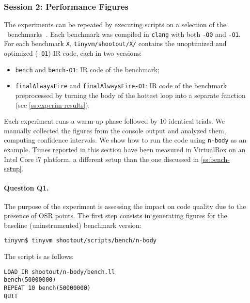 
\subsubsection{Session 2: Performance Figures}

The experiments can be repeated by executing scripts on a selection of the \shootout\ benchmarks~\cite{shootout}. Each benchmark was compiled in {\tt clang} with both {\tt -O0} and {\tt -O1}. For each benchmark {\tt X}, {\tt tinyvm/shootout/X/} contains the unoptimized and optimized ({\tt -O1}) IR code, each in two versions:

\begin{itemize}[parsep=0pt]
\item {\tt bench} and {\tt bench-O1}: IR code of the benchmark;
\item {\tt finalAlwaysFire} and {\tt finalAlwaysFire-O1}: IR code of the benchmark preprocessed by turning the body of the hottest loop into a separate function (see \ref{ss:experim-results}).
\end{itemize}

\noindent Each experiment runs a warm-up phase followed by 10 identical trials. We manually collected the figures from the console output and analyzed them, computing confidence intervals. We show how to run the code using {\tt n-body} as an example. Times reported in this section have been measured in VirtualBox on an Intel Core i7 platform, a different setup than the one discussed in \ref{ss:bench-setup}.

\paragraph{Question Q1.} The purpose of the experiment is assessing the impact on code quality due to the presence of OSR points.
The first step consists in generating figures for the baseline (uninstrumented) benchmark version:
\begin{small}
\begin{verbatim}
tinyvm$ tinyvm shootout/scripts/bench/n-body
\end{verbatim}
\end{small}

\noindent The script is as follows:

\begin{small}
\begin{verbatim}
LOAD_IR shootout/n-body/bench.ll
bench(50000000)
REPEAT 10 bench(50000000)
QUIT
\end{verbatim}
\end{small}

